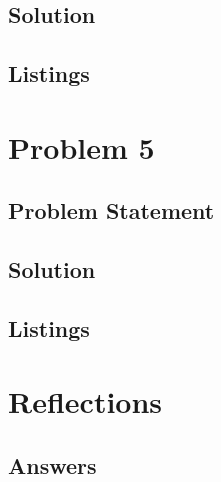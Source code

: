\documentclass[12pt,a4paper,titlepage,oneside]{article}
\begin{document}
\subsection{Solution}

\subsection{Listings}

\newpage
\section{Problem 5}

\subsection{Problem Statement}


\subsection{Solution}

\subsection{Listings}

\newpage
\section{Reflections}



\subsection{Answers}
\end{document}
